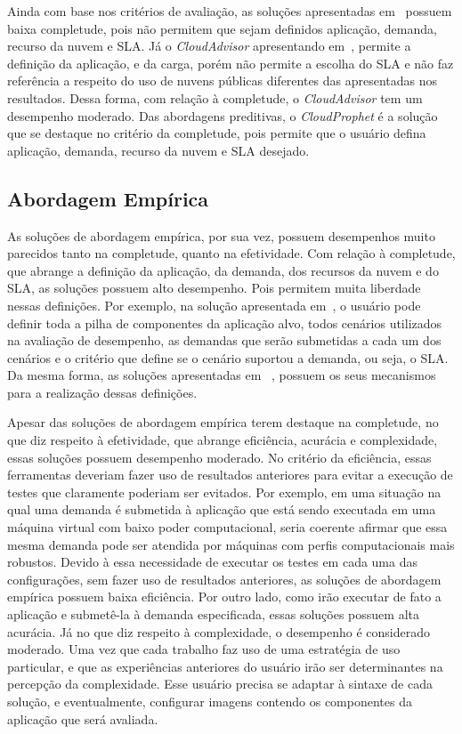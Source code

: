 Ainda com base nos critérios de avaliação, as soluções apresentadas
em~\cite{malkowski2010cloudxplor,cloudharmony} possuem baixa completude, pois
não permitem que sejam definidos aplicação, demanda, recurso da nuvem e SLA. Já
o \textit{CloudAdvisor} apresentando em~\cite{jung2013cloudadvisor}, permite a
definição da aplicação, e da carga, porém não permite a escolha do SLA e não
faz referência a respeito do uso de nuvens públicas diferentes das apresentadas
nos resultados. Dessa forma, com relação à completude, o \textit{CloudAdvisor}
tem um desempenho moderado. Das abordagens preditivas, o \textit{CloudProphet}
é a solução que se destaque no critério da completude, pois permite que o
usuário defina aplicação, demanda, recurso da nuvem e SLA desejado.

\subsection{Abordagem Empírica}
As soluções de abordagem empírica, por sua vez, possuem desempenhos muito
parecidos tanto na completude, quanto na efetividade. Com relação à
completude, que abrange a definição da aplicação, da demanda, dos recursos da
nuvem e do SLA, as soluções possuem alto desempenho. Pois permitem muita
liberdade nessas definições. Por exemplo, na solução apresentada
em~\cite{cunhacloud}, o usuário pode definir toda a pilha de componentes
da aplicação alvo, todos cenários utilizados na avaliação de desempenho, as
demandas que serão submetidas a cada um dos cenários e o critério que define se
o cenário suportou a demanda, ou seja, o SLA. Da mesma forma, as soluções
apresentadas em ~\cite{jayasinghe2012,silva2013cloudbench,scheuner2014cloud},
possuem os seus mecanismos para a realização dessas definições.

Apesar das soluções de abordagem empírica terem destaque na completude, no que
diz respeito à efetividade, que abrange eficiência, acurácia e complexidade,
essas soluções possuem desempenho moderado. No critério da eficiência, essas
ferramentas deveriam fazer uso de resultados anteriores para evitar a execução
de testes que claramente poderiam ser evitados. Por exemplo, em uma situação na qual uma demanda é submetida à aplicação que está sendo
executada em uma máquina virtual com baixo poder computacional, seria coerente
afirmar que essa mesma demanda pode ser atendida por máquinas com perfis
computacionais mais robustos. Devido à essa necessidade de executar os testes em
cada uma das configurações, sem fazer uso de resultados anteriores, as soluções
de abordagem empírica possuem baixa eficiência. Por outro lado, como irão
executar de fato a aplicação e submetê-la à demanda especificada, essas soluções
possuem alta acurácia. Já no que diz respeito à complexidade, o desempenho é
considerado moderado. Uma vez que cada trabalho faz uso de uma estratégia
de uso particular, e que as experiências anteriores do usuário irão ser
determinantes na percepção da complexidade. Esse usuário precisa se adaptar à
sintaxe de cada solução, e eventualmente, configurar imagens contendo os
componentes da aplicação que será avaliada.








